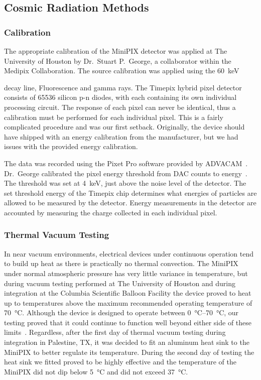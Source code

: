 \subsection{Cosmic Radiation Methods}
\label{sec:Minipix Testing}
	
	\subsubsection{Calibration}   
	The appropriate calibration of the MiniPIX detector was applied at The University of Houston by Dr.~Stuart P.~George, a collaborator within the Medipix Collaboration. The source calibration was applied using the \SI{60}{\keV} { decay line,  Fluorescence and  gamma rays. The Timepix hybrid pixel detector consists of \num{65536} silicon p-n diodes, with each containing its own individual processing circuit. The response of each pixel can never be identical, thus a calibration must be performed for each individual pixel. This is a fairly complicated procedure and was our first setback. Originally, the device should have shipped with an energy calibration from the manufacturer, but we had issues with the provided energy calibration.

	The data was recorded using the Pixet Pro software provided by ADVACAM~\cite{advacam}. Dr.~George calibrated the pixel energy threshold from DAC counts to energy~\cite{stuartthesis}. The threshold was set at \SI{4}{\keV}, just above the noise level of the detector. The set threshold energy of the Timepix chip determines what energies of particles are allowed to be measured by the detector. Energy measurements in the detector are accounted by measuring the charge collected in each individual pixel. 

	
	\subsubsection{Thermal Vacuum Testing}
	 In near vacuum environments, electrical devices under continuous operation tend to build up heat as there is practically no thermal convection. The MiniPIX under normal atmospheric pressure has very little variance in temperature, but during vacuum testing performed at The University of Houston and during integration at the Columbia Scientific Balloon Facility the device proved to heat up to temperatures above the maximum recommended operating temperature of \SI{70}{\celsius}. Although the device is designed to operate between \SIrange{0}{70}{\celsius}, our testing proved that it could continue to function well beyond either side of these limits~\cite{mpdatasheet}. Regardless, after the first day of thermal vacuum testing during integration in Palestine, TX, it was decided to fit an aluminum heat sink to the MiniPIX to better regulate its temperature. During the second day of testing the heat sink we fitted proved to be highly effective and the temperature of the MiniPIX did not dip below  \SI{5}{\celsius} and did not exceed  \SI{37}{\celsius}.

}
